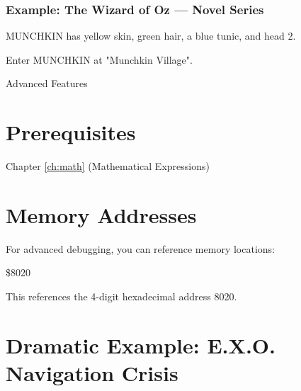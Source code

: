\documentclass[11pt,letterpaper,oldstylefigures]{memoir}
\makeatletter
\newcommand{\stagedir}[1]{#1\par\vspace{1\baselineskip}}
\newenvironment{FountainExample}
  {\begingroup
  \ttfamily\small
   \setlength{\parindent}{0pt}
  \setlength{\parskip}{0.5em}
  \allowdisplaybreaks
  \setlength{\displaywidowpenalty}{0}
  \setlength{\widowpenalty}{0}
  \setlength{\clubpenalty}{0}
  \setlength{\interlinepenalty}{0}
}
  {\endgroup}
\let\oldchapter\chapter
\def\chapter{%
  \@ifstar
    {\FountainScripting@starchapter}%
    {\@dblarg\FountainScripting@chapter}}
\def\FountainScripting@starchapter#1{\oldchapter*{#1}\chaptermark{#1}}
\def\FountainScripting@chapter[#1]#2{\oldchapter[#1]{#2}\chaptermark{#2}}
\newcommand{\sectionbreak}{\newpage}
\makeatother
\begin{document}
\subsubsection{Example: The Wizard of Oz — Novel Series}
\begin{FountainExample}
\stagedir{MUNCHKIN has yellow skin, green hair, a blue tunic, and head 2.}
\stagedir{Enter MUNCHKIN at "Munchkin Village".}
\end{FountainExample}

\chapter{Advanced Features}
\label{ch:advanced}
\sectionbreak

\section{Prerequisites}
Chapter \ref{ch:math} (Mathematical Expressions)

\section{Memory Addresses}

For advanced debugging, you can reference memory locations:

\begin{FountainExample}
\$8020
\end{FountainExample}

This references the 4-digit hexadecimal address 8020.

\section{Dramatic Example: E.X.O. Navigation Crisis}
\end{document}
